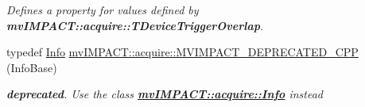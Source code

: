\begin{DoxyCompactItemize}
\begin{DoxyCompactList}\small\item\em Defines a property for values defined by {\bfseries mv\+I\+M\+P\+A\+C\+T\+::acquire\+::\+T\+Device\+Trigger\+Overlap}. \end{DoxyCompactList}\item 
typedef \hyperlink{classmv_i_m_p_a_c_t_1_1acquire_1_1_info}{Info} \hyperlink{group___common_interface_ga3066c4f348d9374a48618855a5797dc9}{mv\+I\+M\+P\+A\+C\+T\+::acquire\+::\+M\+V\+I\+M\+P\+A\+C\+T\+\_\+\+D\+E\+P\+R\+E\+C\+A\+T\+E\+D\+\_\+\+C\+P\+P} (Info\+Base)
\begin{DoxyCompactList}\small\item\em {\bfseries deprecated}. Use the class {\bfseries \hyperlink{classmv_i_m_p_a_c_t_1_1acquire_1_1_info}{mv\+I\+M\+P\+A\+C\+T\+::acquire\+::\+Info}} instead \end{DoxyCompactList}\end{DoxyCompactItemize}
